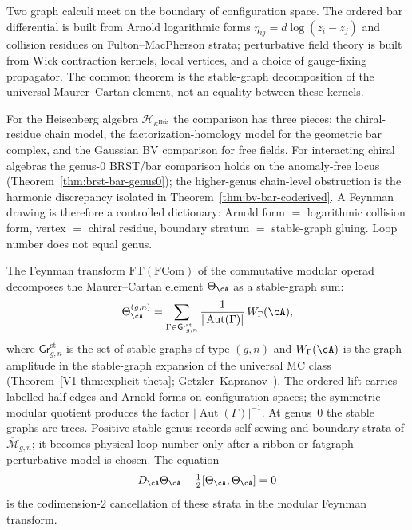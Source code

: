 Two graph calculi meet on the boundary of configuration space.  The
ordered bar differential is built from Arnold logarithmic forms
$\eta_{ij}=d\log(z_i-z_j)$ and collision residues on
Fulton--MacPherson strata; perturbative field theory is built from
Wick contraction kernels, local vertices, and a choice of gauge-fixing
propagator.  The common theorem is the stable-graph decomposition of
the universal Maurer--Cartan element, not an equality between these
kernels.

For the Heisenberg algebra $\mathcal{H}_{\kappa^{\mathrm{Heis}}}$
the comparison has three pieces: the chiral-residue chain
model, the factorization-homology model for the geometric bar
complex, and the Gaussian BV comparison for free fields.  For
interacting chiral algebras the genus-$0$ BRST/bar comparison holds on
the anomaly-free locus (Theorem~\ref{thm:brst-bar-genus0}); the
higher-genus chain-level obstruction is the harmonic discrepancy
isolated in Theorem~\ref{thm:bv-bar-coderived}.  A Feynman drawing
is therefore a controlled dictionary: Arnold form
$=$ logarithmic collision form, vertex $=$ chiral residue, boundary
stratum $=$ stable-graph gluing.  Loop number does not equal genus.

\begin{construction}
\label{constr:feynman-stable-graph}
The Feynman transform $\mathrm{FT}(\mathrm{FCom})$ of the commutative
modular operad decomposes the Maurer--Cartan element $\Theta_\cA$ as
a stable-graph sum:
\[
\Theta_\cA^{(g,n)} =
\sum_{\Gamma \in \mathsf{Gr}^{\mathrm{st}}_{g,n}}
\frac{1}{|\operatorname{Aut}(\Gamma)|}\, W_\Gamma(\cA),
\]
where $\mathsf{Gr}^{\mathrm{st}}_{g,n}$ is the set of stable graphs of
type $(g,n)$ and $W_\Gamma(\cA)$ is the graph amplitude in the
stable-graph expansion of the universal MC class
(Theorem~\ref{V1-thm:explicit-theta};
Getzler--Kapranov~\cite[Theorem~5.4]{GeK98}).  The ordered
lift carries labelled half-edges and Arnold forms on configuration
spaces; the symmetric modular quotient produces the factor
$|\operatorname{Aut}(\Gamma)|^{-1}$.  At genus~$0$ the stable graphs
are trees.  Positive stable genus records self-sewing and boundary
strata of $\overline{\mathcal{M}}_{g,n}$; it becomes physical loop
number only after a ribbon or fatgraph perturbative model is
chosen.  The equation
\[
D_\cA\Theta_\cA+\tfrac{1}{2}[\Theta_\cA,\Theta_\cA]=0
\]
is the codimension-$2$ cancellation of these strata
in the modular Feynman transform.
\end{construction}

